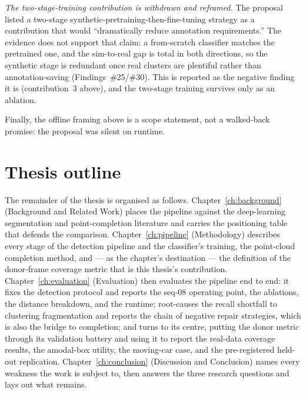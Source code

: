 \emph{The two-stage-training contribution is withdrawn and reframed.} The proposal
listed a two-stage synthetic-pretraining-then-fine-tuning strategy as a contribution
that would ``dramatically reduce annotation requirements.'' The evidence does not
support that claim: a from-scratch classifier matches the pretrained one, and the
sim-to-real gap is total in both directions, so the synthetic stage is redundant
once real clusters are plentiful rather than annotation-saving (Findings~\#25/\#30).
This is reported as the negative finding it is (contribution~3 above), and the
two-stage training survives only as an ablation.

Finally, the offline framing above is a scope statement, not a walked-back promise:
the proposal was silent on runtime.

\section{Thesis outline}
\label{sec:intro-outline}

The remainder of the thesis is organised as follows. Chapter~\ref{ch:background}
(Background and Related Work) places the pipeline against the deep-learning
segmentation and point-completion literature and carries the positioning table
that defends the comparison. Chapter~\ref{ch:pipeline} (Methodology) describes
every stage of the detection pipeline and the classifier's training, the
point-cloud completion method, and --- as the chapter's destination --- the
definition of the donor-frame coverage metric that is this thesis's contribution.
Chapter~\ref{ch:evaluation} (Evaluation) then evaluates the pipeline end to end:
it fixes the detection protocol and reports the seq-08 operating point, the
ablations, the distance breakdown, and the runtime; root-causes the recall
shortfall to clustering fragmentation and reports the chain of negative repair
strategies, which is also the bridge to completion; and turns to its centre,
putting the donor metric through its validation battery and using it to report
the real-data coverage results, the amodal-box utility, the moving-car case, and
the pre-registered held-out replication. Chapter~\ref{ch:conclusion} (Discussion
and Conclusion) names every weakness the work is subject to, then answers the three
research questions and lays out what remains.
